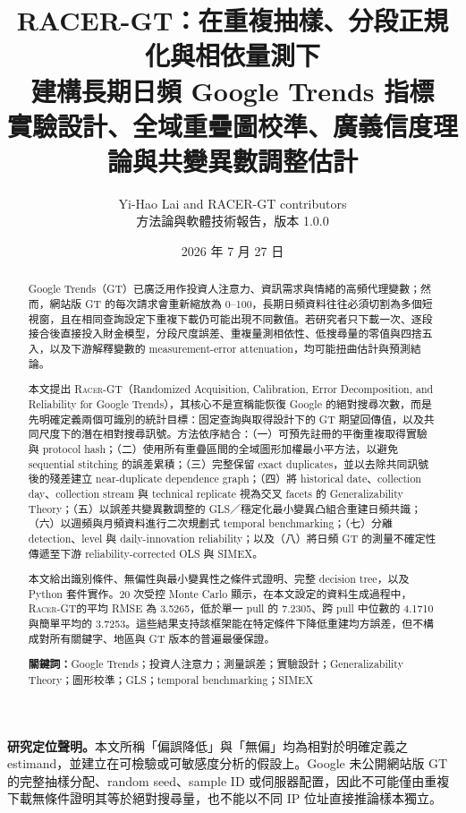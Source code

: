 \documentclass[12pt,a4paper,oneside]{article}
\title{\bfseries
RACER-GT：在重複抽樣、分段正規化與相依量測下\\
建構長期日頻 Google Trends 指標\\[0.5em]
\large 實驗設計、全域重疊圖校準、廣義信度理論與共變異數調整估計
}
\author{Yi-Hao Lai and RACER-GT contributors\\
\small 方法論與軟體技術報告，版本 1.0.0}
\date{2026 年 7 月 27 日}
\newcommand{\RACER}{\textsc{Racer-GT}}
\begin{document}
\maketitle

\begin{abstract}
Google Trends（GT）已廣泛用作投資人注意力、資訊需求與情緒的高頻代理變數；然而，網站版 GT 的每次請求會重新縮放為 0--100，長期日頻資料往往必須切割為多個短視窗，且在相同查詢設定下重複下載仍可能出現不同數值。若研究者只下載一次、逐段接合後直接投入財金模型，分段尺度誤差、重複量測相依性、低搜尋量的零值與四捨五入，以及下游解釋變數的 measurement-error attenuation，均可能扭曲估計與預測結論。

本文提出 \RACER（Randomized Acquisition, Calibration, Error Decomposition, and Reliability for Google Trends），其核心不是宣稱能恢復 Google 的絕對搜尋次數，而是先明確定義兩個可識別的統計目標：固定查詢與取得設計下的 GT 期望回傳值，以及共同尺度下的潛在相對搜尋訊號。方法依序結合：（一）可預先註冊的平衡重複取得實驗與 protocol hash；（二）使用所有重疊區間的全域圖形加權最小平方法，以避免 sequential stitching 的誤差累積；（三）完整保留 exact duplicates，並以去除共同訊號後的殘差建立 near-duplicate dependence graph；（四）將 historical date、collection day、collection stream 與 technical replicate 視為交叉 facets 的 Generalizability Theory；（五）以誤差共變異數調整的 GLS／穩定化最小變異凸組合重建日頻共識；（六）以週頻與月頻資料進行二次規劃式 temporal benchmarking；（七）分離 detection、level 與 daily-innovation reliability；以及（八）將日頻 GT 的測量不確定性傳遞至下游 reliability-corrected OLS 與 SIMEX。

本文給出識別條件、無偏性與最小變異性之條件式證明、完整 decision tree，以及 Python 套件實作。20 次受控 Monte Carlo 顯示，在本文設定的資料生成過程中，\RACER 的平均 RMSE 為 3.5265，低於單一 pull 的 7.2305、跨 pull 中位數的 4.1710 與簡單平均的 3.7253。這些結果支持該框架能在特定條件下降低重建均方誤差，但不構成對所有關鍵字、地區與 GT 版本的普遍最優保證。

\noindent\textbf{關鍵詞：}Google Trends；投資人注意力；測量誤差；實驗設計；Generalizability Theory；圖形校準；GLS；temporal benchmarking；SIMEX
\end{abstract}

\begin{center}
\begin{minipage}{0.94\textwidth}
\small
\textbf{研究定位聲明。}本文所稱「偏誤降低」與「無偏」均為相對於明確定義之 estimand，並建立在可檢驗或可敏感度分析的假設上。Google 未公開網站版 GT 的完整抽樣分配、random seed、sample ID 或伺服器配置，因此不可能僅由重複下載無條件證明其等於絕對搜尋量，也不能以不同 IP 位址直接推論樣本獨立。
\end{minipage}
\end{center}
\end{document}

